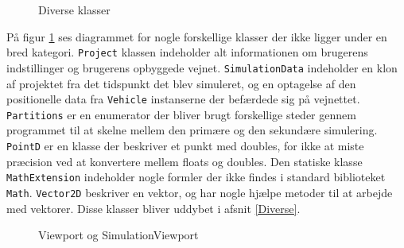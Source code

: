 \begin{figure}[H]
    \centering
    \caption{Diverse klasser}
    \label{kdDiverse}
\end{figure}

På figur \ref{kdDiverse} ses diagrammet for nogle forskellige klasser der ikke ligger under en bred kategori. \texttt{Project} klassen indeholder alt informationen om brugerens indstillinger og brugerens opbyggede vejnet. \texttt{SimulationData} indeholder en klon af projektet fra det tidspunkt det blev simuleret, og en optagelse af den positionelle data fra \texttt{Vehicle} instanserne der befærdede sig på vejnettet. \texttt{Partitions} er en enumerator der bliver brugt forskellige steder gennem programmet til at skelne mellem den primære og den sekundære simulering. \texttt{PointD} er en klasse der beskriver et punkt med doubles, for ikke at miste præcision ved at konvertere mellem floats og doubles. Den statiske klasse \texttt{MathExtension} indeholder nogle formler der ikke findes i standard biblioteket \texttt{Math}. \texttt{Vector2D} beskriver en vektor, og har nogle hjælpe metoder til at arbejde med vektorer. Disse klasser bliver uddybet i afsnit \ref{Diverse}.


\begin{figure}[H]
    \centering
    \caption{Viewport og SimulationViewport}
    \label{kdViewport}
\end{figure}


